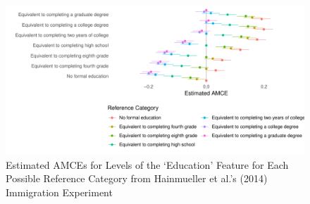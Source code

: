 \documentclass[a4paper,12pt]{article}\usepackage[]{graphicx}\usepackage[]{color}
\makeatletter
\def\maxwidth{ %
  \ifdim\Gin@nat@width>\linewidth
    \linewidth
  \else
    \Gin@nat@width
  \fi
}
\newenvironment{knitrout}{}{} %
\makeatother
\begin{document}
\begin{knitrout}
\color{fgcolor}\begin{figure}
\includegraphics[width=\maxwidth]{figure/reference_category-1} \caption[Estimated AMCEs for Levels of the `Education' Feature for Each Possible Reference Category from Hainmueller et al.'s (2014) Immigration Experiment]{Estimated AMCEs for Levels of the `Education' Feature for Each Possible Reference Category from Hainmueller et al.'s (2014) Immigration Experiment}\label{fig:reference_category}
\end{figure}


\end{knitrout}
\end{document}
